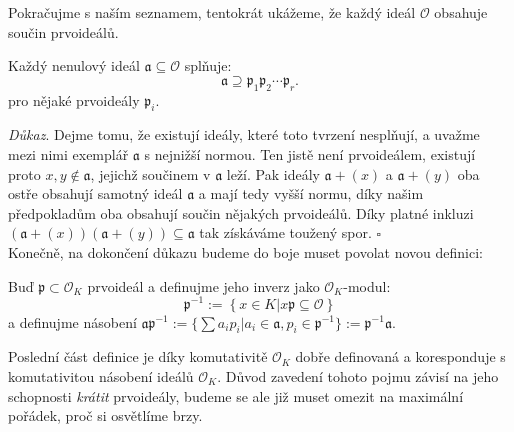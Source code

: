 \documentclass [12pt]{report}
\begin{document}
Pokračujme s naším seznamem, tentokrát ukážeme, že každý ideál $\mathcal{O}$ obsahuje součin prvoideálů.

\begin{veta}\label{obsahprvo}
Každý nenulový ideál $\mathfrak{a} \subseteq \mathcal{O}$ splňuje:
\begin{equation*}
\mathfrak{a} \supseteq \mathfrak{p}_1 \mathfrak{p}_2 \cdots \mathfrak{p}_r.
\end{equation*}
pro nějaké prvoideály $\mathfrak{p}_i$.
\end{veta}

\noindent \textit{Důkaz}. Dejme tomu, že existují ideály, které toto tvrzení nesplňují, a uvažme mezi nimi exemplář $\mathfrak{a}$ s nejnižší normou. Ten jistě není prvoideálem, existují proto $x,y \not\in \mathfrak{a}$, jejichž součinem v $\mathfrak{a}$ leží. Pak ideály $\mathfrak{a}+(x)$ a $\mathfrak{a}+(y)$ oba ostře obsahují samotný ideál $\mathfrak{a}$ a mají tedy vyšší normu, díky našim předpokladům oba obsahují součin nějakých prvoideálů. Díky platné inkluzi $(\mathfrak{a}+(x) ) (\mathfrak{a}+(y)) \subseteq \mathfrak{a}$ tak získáváme toužený spor. \hfill $\square$\\


Konečně, na dokončení důkazu budeme do boje muset povolat novou definici:
\begin{definice}
Buď $\mathfrak{p} \subset \mathcal{O}_K$ prvoideál a definujme jeho inverz jako $\mathcal{O}_K$-modul:
\begin{equation*}
\mathfrak{p}^{-1} := \left\lbrace x \in K \left\vert \right. x \mathfrak{p} \subseteq \mathcal{O} \right\rbrace
\end{equation*}
a definujme násobení $\mathfrak{a} \mathfrak{p}^{-1} := \lbrace \sum a_i p_i \vert a_i \in \mathfrak{a}, p_i \in \mathfrak{p}^{-1} \rbrace := \mathfrak{p}^{-1} \mathfrak{a}$.
\end{definice}

Poslední část definice je díky komutativitě $\mathcal{O}_K$ dobře definovaná a koresponduje s komutativitou násobení ideálů $\mathcal{O}_K$. Důvod zavedení tohoto pojmu závisí na jeho schopnosti \textit{krátit} prvoideály, budeme se ale již muset omezit na maximální pořádek, proč si osvětlíme brzy.
\end{document}
